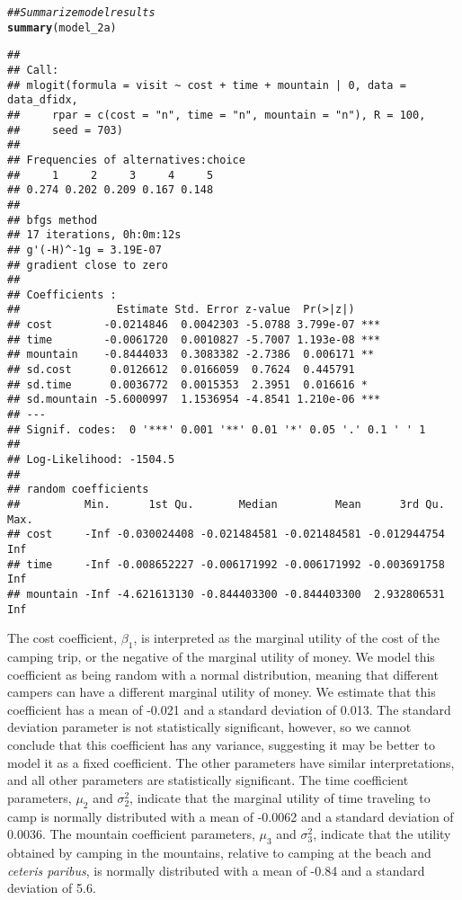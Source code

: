\documentclass[11pt,letterpaper]{article}\usepackage[]{graphicx}\usepackage[]{color}
\makeatletter
\newcommand{\hlcom}[1]{\textcolor[rgb]{0.678,0.584,0.686}{\textit{#1}}}%
\newcommand{\hlstd}[1]{\textcolor[rgb]{0.345,0.345,0.345}{#1}}%
\newcommand{\hlkwd}[1]{\textcolor[rgb]{0.737,0.353,0.396}{\textbf{#1}}}%
\newenvironment{kframe}{%
 \def\at@end@of@kframe{}%
 \ifinner\ifhmode%
  \def\at@end@of@kframe{\end{minipage}}%
  \begin{minipage}{\columnwidth}%
 \fi\fi%
 \def\FrameCommand##1{\hskip\@totalleftmargin \hskip-\fboxsep
 \colorbox{shadecolor}{##1}\hskip-\fboxsep
     \hskip-\linewidth \hskip-\@totalleftmargin \hskip\columnwidth}%
 \MakeFramed {\advance\hsize-\width
   \@totalleftmargin\z@ \linewidth\hsize
   \@setminipage}}%
 {\par\unskip\endMakeFramed%
 \at@end@of@kframe}
\newenvironment{knitrout}{}{} %
\makeatother
\begin{document}
\begin{enumerate}[label=\alph*., leftmargin=*]
\begin{enumerate}[label=\roman*.]
\begin{knitrout}
\color{fgcolor}\begin{kframe}
\begin{alltt}
\hlcom{## Summarize model results}
\hlkwd{summary}\hlstd{(model_2a)}
\end{alltt}
\begin{verbatim}
## 
## Call:
## mlogit(formula = visit ~ cost + time + mountain | 0, data = data_dfidx, 
##     rpar = c(cost = "n", time = "n", mountain = "n"), R = 100, 
##     seed = 703)
## 
## Frequencies of alternatives:choice
##     1     2     3     4     5 
## 0.274 0.202 0.209 0.167 0.148 
## 
## bfgs method
## 17 iterations, 0h:0m:12s 
## g'(-H)^-1g = 3.19E-07 
## gradient close to zero 
## 
## Coefficients :
##               Estimate Std. Error z-value  Pr(>|z|)    
## cost        -0.0214846  0.0042303 -5.0788 3.799e-07 ***
## time        -0.0061720  0.0010827 -5.7007 1.193e-08 ***
## mountain    -0.8444033  0.3083382 -2.7386  0.006171 ** 
## sd.cost      0.0126612  0.0166059  0.7624  0.445791    
## sd.time      0.0036772  0.0015353  2.3951  0.016616 *  
## sd.mountain -5.6000997  1.1536954 -4.8541 1.210e-06 ***
## ---
## Signif. codes:  0 '***' 0.001 '**' 0.01 '*' 0.05 '.' 0.1 ' ' 1
## 
## Log-Likelihood: -1504.5
## 
## random coefficients
##          Min.      1st Qu.       Median         Mean      3rd Qu. Max.
## cost     -Inf -0.030024408 -0.021484581 -0.021484581 -0.012944754  Inf
## time     -Inf -0.008652227 -0.006171992 -0.006171992 -0.003691758  Inf
## mountain -Inf -4.621613130 -0.844403300 -0.844403300  2.932806531  Inf
\end{verbatim}
\end{kframe}
\end{knitrout}

		The cost coefficient, $\beta_1$, is interpreted as the marginal utility of the cost of the camping trip, or the negative of the marginal utility of money. We model this coefficient as being random with a normal distribution, meaning that different campers can have a different marginal utility of money. We estimate that this coefficient has a mean of -0.021 and a standard deviation of 0.013. The standard deviation parameter is not statistically significant, however, so we cannot conclude that this coefficient has any variance, suggesting it may be better to model it as a fixed coefficient. The other parameters have similar interpretations, and all other parameters are statistically significant. The time coefficient parameters, $\mu_2$ and $\sigma_2^2$, indicate that the marginal utility of time traveling to camp is normally distributed with a mean of -0.0062 and a standard deviation of 0.0036. The mountain coefficient parameters, $\mu_3$ and $\sigma_3^2$, indicate that the utility obtained by camping in the mountains, relative to camping at the beach and \emph{ceteris paribus}, is normally distributed with a mean of -0.84 and a standard deviation of 5.6.
	\end{enumerate}


\end{enumerate}
\end{document}
